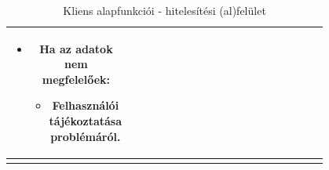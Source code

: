\documentclass[twoside, a4paper, 12pt]{book}
\begin{document}
\begin{longtable}[c]{|c|p{0.8\linewidth}|}
\begin{itemize}
		\item Ha az adatok nem megfelelőek:
		\begin{itemize}
			\item Felhasználói tájékoztatása problémáról.
		\end{itemize}
	\end{itemize}
	\\
	\hline
	
	\caption{Kliens alapfunkciói - hitelesítési (al)felület}
	\label{userStories:client:authentication}\\
\end{longtable}

\end{document}
